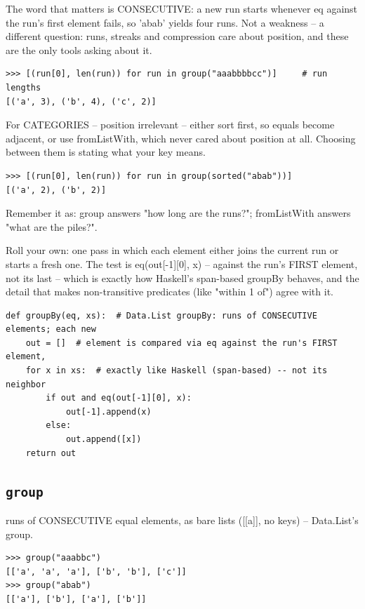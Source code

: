 \documentclass[10pt,letterpaper]{book}
\begin{document}
The word that matters is CONSECUTIVE: a new run starts whenever eq against the run's first element fails, so 'abab' yields four runs. Not a weakness -- a different question: runs, streaks and compression care about position, and these are the only tools asking about it.

\begin{lstlisting}[style=ex]
>>> [(run[0], len(run)) for run in group("aaabbbbcc")]     # run lengths
[('a', 3), ('b', 4), ('c', 2)]
\end{lstlisting}

For CATEGORIES -- position irrelevant -- either sort first, so equals become adjacent, or use fromListWith, which never cared about position at all. Choosing between them is stating what your key means.

\begin{lstlisting}[style=ex]
>>> [(run[0], len(run)) for run in group(sorted("abab"))]
[('a', 2), ('b', 2)]
\end{lstlisting}

Remember it as: group answers "how long are the runs?"; fromListWith answers "what are the piles?".


Roll your own: one pass in which each element either joins the current run or starts a fresh one. The test is eq(out[-1][0], x) -- against the run's FIRST element, not its last -- which is exactly how Haskell's span-based groupBy behaves, and the detail that makes non-transitive predicates (like "within 1 of") agree with it.

\begin{lstlisting}[style=ex]
def groupBy(eq, xs):  # Data.List groupBy: runs of CONSECUTIVE elements; each new
    out = []  # element is compared via eq against the run's FIRST element,
    for x in xs:  # exactly like Haskell (span-based) -- not its neighbor
        if out and eq(out[-1][0], x):
            out[-1].append(x)
        else:
            out.append([x])
    return out
\end{lstlisting}

\subsection{\texttt{group}}\label{def:group}
runs of CONSECUTIVE equal elements, as bare lists ([[a]], no keys) -- Data.List's group.
\begin{lstlisting}[style=ex]
>>> group("aaabbc")
[['a', 'a', 'a'], ['b', 'b'], ['c']]
>>> group("abab")
[['a'], ['b'], ['a'], ['b']]
\end{lstlisting}
\end{document}
